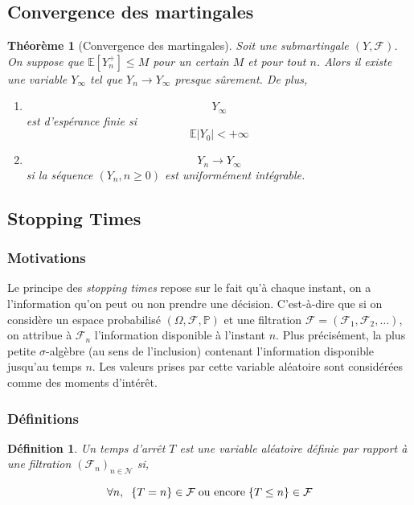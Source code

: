 \documentclass[a4paper]{article}
\newtheorem{theorem}{Théorème}[section]
\newtheorem{definition}{Définition}
\begin{document}
\subsection{Convergence des martingales}
\begin{theorem}[Convergence des martingales] Soit une submartingale $(Y, \mathcal{F})$. On suppose que $\mathbb{E}[Y_n^+] \leq M$ pour un certain $M$ et pour tout $n$. Alors il existe une variable $Y_{\infty}$ tel que $Y_n \longrightarrow Y_{\infty}$ presque sûrement. De plus,
\begin{enumerate}
    \item \[ Y_{\infty} \] est d'espérance finie si \[ \mathbb{E}|Y_0|< + \infty \]
    \item \[ Y_n \longrightarrow Y_{\infty}\] si la séquence $(Y_n, n \geq 0)$ est uniformément intégrable.
\end{enumerate}
\end{theorem}
\subsection{Stopping Times}
\subsubsection{Motivations} Le principe des \textit{stopping times} repose sur le fait qu'à chaque instant, on a l'information qu'on peut ou non prendre une décision. C'est-à-dire que si on considère un espace probabilisé $(\Omega, \mathcal{F}, \mathbb{P})$ et une filtration $\mathcal{F} = (\mathcal{F}_1, \mathcal{F}_2, \dots)$, on attribue à $\mathcal{F}_n$ l'information disponible à l'instant $n$. Plus précisément, la plus petite $\sigma$-algèbre (au sens de l'inclusion) contenant l'information disponible jusqu'au temps $n$. Les valeurs prises par cette variable aléatoire sont considérées comme des moments d'intérêt.
\subsubsection{Définitions}
\begin{definition}
Un temps d'arrêt $T$ est une variable aléatoire définie par rapport à une filtration $(\mathcal{F}_n)_{n\in \mathcal{N}}$ si,
\end{definition}
\begin{equation}
    \forall n, \hspace{2mm}\{T=n\} \in \mathcal{F} \hspace{1mm} \text{ou encore} \hspace{1mm}\{T\leq n\} \in \mathcal{F}
\end{equation}
\end{document}
